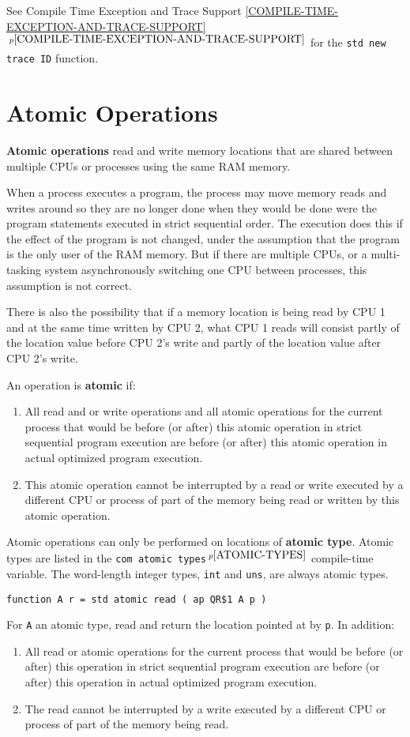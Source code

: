 \documentclass[12pt]{article}
\newcommand{\key}[1]{{\rm \bfseries #1}}
\newcommand{\itemref}[1]{\ref{#1}$\,^{p\pageref{#1}}$}
\newcommand{\pagnote}[1]{$\,^{p\pageref{#1}}$}
\newenvironment{indpar}[1][0.3in]%
	{\begin{list}{}%
		     {\setlength{\itemsep}{0in}%
		      \setlength{\topsep}{0in}%
		      \setlength{\parsep}{1ex}%
		      \setlength{\labelwidth}{#1}%
		      \setlength{\leftmargin}{#1}%
		      \addtolength{\leftmargin}{\labelsep}}%
	 \item}%
	{\end{list}}
\begin{document}
See Compile Time Exception and Trace Support
\itemref{COMPILE-TIME-EXCEPTION-AND-TRACE-SUPPORT}
for the {\tt std new trace ID} function.


\section{Atomic Operations}
\label{ATOMIC-OPERATIONS}

\key{Atomic operations} read and write memory locations
that are shared between multiple CPUs or processes
using the same RAM memory.

When a process executes a program, the process may move
memory reads and writes around so they are no longer
done when they would be done were the program
statements executed in strict sequential order.  The
execution does this if the effect of the program is not
changed, under the assumption that the program is the
only user of the RAM memory.  But if there are multiple CPUs,
or a multi-tasking system asynchronously switching one CPU
between processes, this assumption is not correct.

There is also the possibility that if a memory location is
being read by CPU 1 and at the same time written by CPU 2,
what CPU 1 reads will consist partly of the location value
before CPU 2's write and partly of the location value after
CPU 2's write.

An operation is \key{atomic} if:
\begin{indpar}
\begin{enumerate}
\item
All read and or write operations and all atomic operations
for the current process that would be
before (or after) this atomic operation in strict sequential program execution
are before (or after) this atomic operation
in actual optimized program execution.
\item
This atomic operation cannot be interrupted by a read or write executed by a
different CPU or process of part of the memory being read or written
by this atomic operation.
\end{enumerate}
\end{indpar}

Atomic operations can only be performed on locations of \key{atomic type}.
Atomic types are listed in the {\tt com atomic types}\pagnote{ATOMIC-TYPES}
compile-time variable.
The word-length integer types, {\tt int} and {\tt uns}, are
always atomic types.

{\tt function A r = std atomic read ( ap QR\$1 A p )}
\begin{indpar}
For {\tt A} an atomic type,
read and return the location pointed at by {\tt p}.  In addition:
\begin{enumerate}
\item
All read or atomic operations for the current process that would be
before (or after) this operation in strict sequential program execution
are before (or after) this operation in actual optimized program execution.
\item
The read cannot be interrupted by a write executed by a different CPU
or process of part of the memory being read.
\end{enumerate}
\end{indpar}
\end{document}
